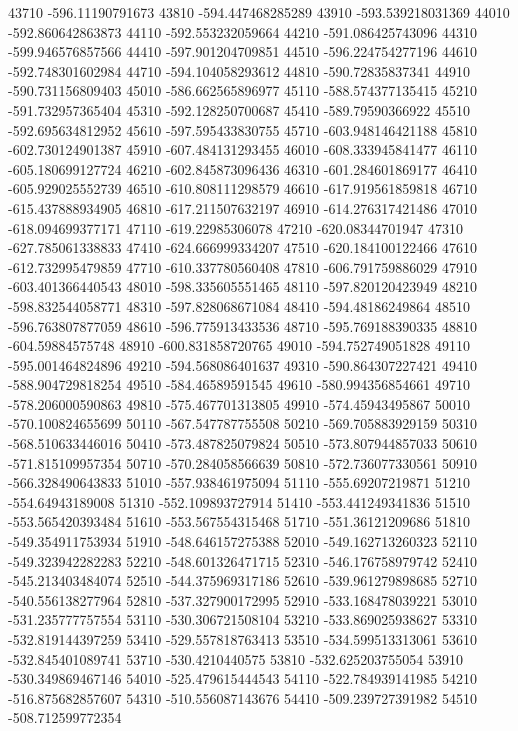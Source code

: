 {43710 -596.11190791673
43810 -594.447468285289
43910 -593.539218031369
44010 -592.860642863873
44110 -592.553232059664
44210 -591.086425743096
44310 -599.946576857566
44410 -597.901204709851
44510 -596.224754277196
44610 -592.748301602984
44710 -594.104058293612
44810 -590.72835837341
44910 -590.731156809403
45010 -586.662565896977
45110 -588.574377135415
45210 -591.732957365404
45310 -592.128250700687
45410 -589.79590366922
45510 -592.695634812952
45610 -597.595433830755
45710 -603.948146421188
45810 -602.730124901387
45910 -607.484131293455
46010 -608.333945841477
46110 -605.180699127724
46210 -602.845873096436
46310 -601.284601869177
46410 -605.929025552739
46510 -610.808111298579
46610 -617.919561859818
46710 -615.437888934905
46810 -617.211507632197
46910 -614.276317421486
47010 -618.094699377171
47110 -619.22985306078
47210 -620.08344701947
47310 -627.785061338833
47410 -624.666999334207
47510 -620.184100122466
47610 -612.732995479859
47710 -610.337780560408
47810 -606.791759886029
47910 -603.401366440543
48010 -598.335605551465
48110 -597.820120423949
48210 -598.832544058771
48310 -597.828068671084
48410 -594.48186249864
48510 -596.763807877059
48610 -596.775913433536
48710 -595.769188390335
48810 -604.59884575748
48910 -600.831858720765
49010 -594.752749051828
49110 -595.001464824896
49210 -594.568086401637
49310 -590.864307227421
49410 -588.904729818254
49510 -584.46589591545
49610 -580.994356854661
49710 -578.206000590863
49810 -575.467701313805
49910 -574.45943495867
50010 -570.100824655699
50110 -567.547787755508
50210 -569.705883929159
50310 -568.510633446016
50410 -573.487825079824
50510 -573.807944857033
50610 -571.815109957354
50710 -570.284058566639
50810 -572.736077330561
50910 -566.328490643833
51010 -557.938461975094
51110 -555.69207219871
51210 -554.64943189008
51310 -552.109893727914
51410 -553.441249341836
51510 -553.565420393484
51610 -553.567554315468
51710 -551.36121209686
51810 -549.354911753934
51910 -548.646157275388
52010 -549.162713260323
52110 -549.323942282283
52210 -548.601326471715
52310 -546.176758979742
52410 -545.213403484074
52510 -544.375969317186
52610 -539.961279898685
52710 -540.556138277964
52810 -537.327900172995
52910 -533.168478039221
53010 -531.235777757554
53110 -530.306721508104
53210 -533.869025938627
53310 -532.819144397259
53410 -529.557818763413
53510 -534.599513313061
53610 -532.845401089741
53710 -530.4210440575
53810 -532.625203755054
53910 -530.349869467146
54010 -525.479615444543
54110 -522.784939141985
54210 -516.875682857607
54310 -510.556087143676
54410 -509.239727391982
54510 -508.712599772354
}
